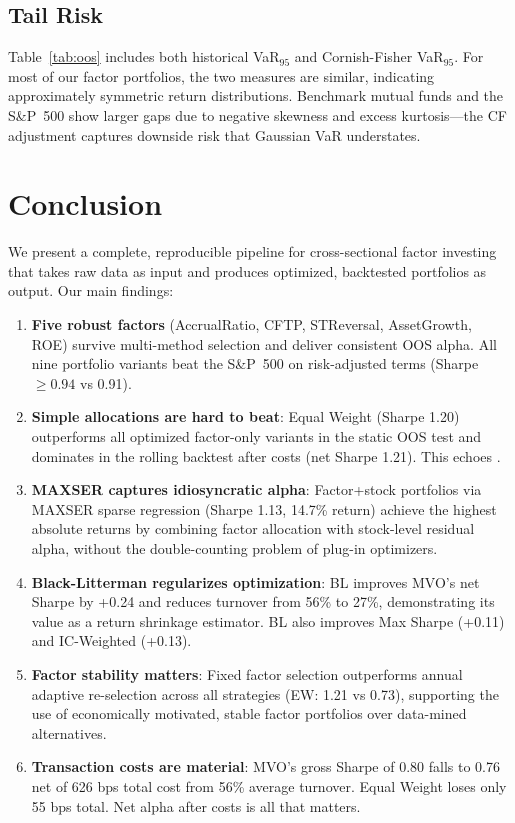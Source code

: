 \documentclass[12pt,a4paper]{article}
\begin{document}
\subsection{Tail Risk}

Table~\ref{tab:oos} includes both historical VaR$_{95}$ and Cornish-Fisher VaR$_{95}$. For most of our factor portfolios, the two measures are similar, indicating approximately symmetric return distributions. Benchmark mutual funds and the S\&P~500 show larger gaps due to negative skewness and excess kurtosis---the CF adjustment captures downside risk that Gaussian VaR understates.

\section{Conclusion}

We present a complete, reproducible pipeline for cross-sectional factor investing that takes raw data as input and produces optimized, backtested portfolios as output. Our main findings:

\begin{enumerate}
    \item \textbf{Five robust factors} (AccrualRatio, CFTP, STReversal, AssetGrowth, ROE) survive multi-method selection and deliver consistent OOS alpha. All nine portfolio variants beat the S\&P~500 on risk-adjusted terms (Sharpe $\geq 0.94$ vs 0.91).

    \item \textbf{Simple allocations are hard to beat}: Equal Weight (Sharpe 1.20) outperforms all optimized factor-only variants in the static OOS test and dominates in the rolling backtest after costs (net Sharpe 1.21). This echoes \citet{demiguel2009optimal}.

    \item \textbf{MAXSER captures idiosyncratic alpha}: Factor+stock portfolios via MAXSER sparse regression (Sharpe 1.13, 14.7\% return) achieve the highest absolute returns by combining factor allocation with stock-level residual alpha, without the double-counting problem of plug-in optimizers.

    \item \textbf{Black-Litterman regularizes optimization}: BL improves MVO's net Sharpe by +0.24 and reduces turnover from 56\% to 27\%, demonstrating its value as a return shrinkage estimator. BL also improves Max Sharpe (+0.11) and IC-Weighted (+0.13).

    \item \textbf{Factor stability matters}: Fixed factor selection outperforms annual adaptive re-selection across all strategies (EW: 1.21 vs 0.73), supporting the use of economically motivated, stable factor portfolios over data-mined alternatives.

    \item \textbf{Transaction costs are material}: MVO's gross Sharpe of 0.80 falls to 0.76 net of 626 bps total cost from 56\% average turnover. Equal Weight loses only 55 bps total. Net alpha after costs is all that matters.
\end{enumerate}
\end{document}
